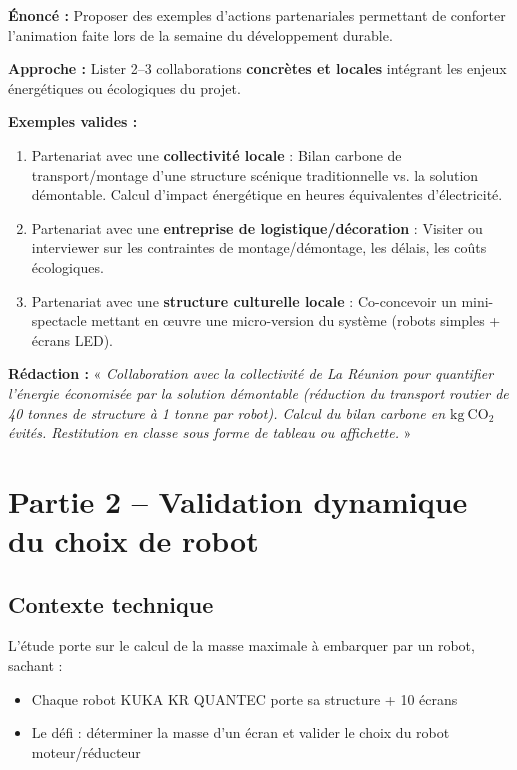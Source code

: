 \documentclass[12pt,a4paper,twoside]{article}
\begin{document}
\begin{correction}
  \textbf{Énoncé :} Proposer des exemples d'actions partenariales permettant de conforter l'animation faite lors de la semaine du développement durable.

  \textbf{Approche :} Lister 2--3 collaborations \textbf{concrètes et locales} intégrant les enjeux énergétiques ou écologiques du projet.

  \textbf{Exemples valides :}
  \begin{enumerate}
    \item Partenariat avec une \textbf{collectivité locale} : Bilan carbone de transport/montage d'une structure scénique traditionnelle vs. la solution démontable. Calcul d'impact énergétique en heures équivalentes d'électricité.

    \item Partenariat avec une \textbf{entreprise de logistique/décoration} : Visiter ou interviewer sur les contraintes de montage/démontage, les délais, les coûts écologiques.

    \item Partenariat avec une \textbf{structure culturelle locale} : Co-concevoir un mini-spectacle mettant en œuvre une micro-version du système (robots simples + écrans LED).
  \end{enumerate}

  \textbf{Rédaction :} « \textit{Collaboration avec la collectivité de La Réunion pour quantifier l'énergie économisée par la solution démontable (réduction du transport routier de 40 tonnes de structure à 1 tonne par robot). Calcul du bilan carbone en $\mathrm{kg~CO_2}$ évités. Restitution en classe sous forme de tableau ou affichette.} »
\end{correction}

\newpage

\section{Partie 2 -- Validation dynamique du choix de robot}

\subsection*{Contexte technique}
L'étude porte sur le calcul de la masse maximale à embarquer par un robot, sachant :
\begin{itemize}
  \item Chaque robot KUKA KR QUANTEC porte sa structure + 10 écrans
  \item Le défi : déterminer la masse d'un écran et valider le choix du robot moteur/réducteur
\end{itemize}
\end{document}
